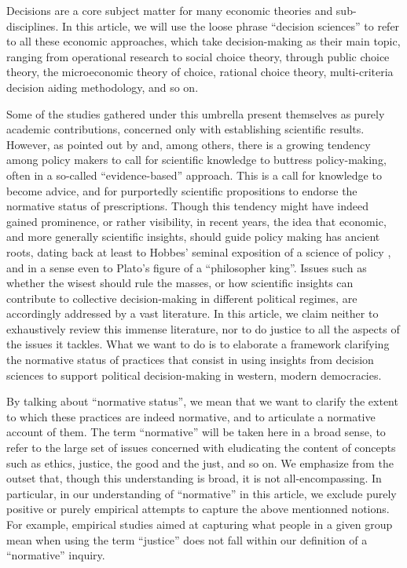 \documentclass[preprint,11pt]{elsarticle}
\begin{document}
\noindent Decisions are a core subject matter for many economic theories and sub-disciplines. In this article, we will use the loose phrase ``decision sciences'' to refer to all these economic approaches, which take decision-making as their main topic, ranging from operational research to social choice theory, through public choice theory, the microeconomic theory of choice, rational choice theory, multi-criteria decision aiding methodology, and so on.

Some of the studies gathered under this umbrella present themselves as purely academic contributions, concerned only with establishing scientific results. However, as pointed out by \cite{tsoukias_policy_2013} and\cite{marchi_evidence-based_2016}, among others, there is a growing tendency among policy makers to call for scientific knowledge to buttress policy-making, often in a so-called ``evidence-based'' approach. This is a call for knowledge to become advice, and for purportedly scientific propositions to endorse the normative status of prescriptions. Though this tendency might have indeed gained prominence, or rather visibility, in recent years, the idea that economic, and more generally scientific insights, should guide policy making has ancient roots, dating back at least to Hobbes’ seminal exposition of a science of policy \citep{skinner_reason_1996}, and in a sense even to Plato’s figure of a ``philosopher king''. Issues such as whether the wisest should rule the masses, or how scientific insights can contribute to collective decision-making in different political regimes, are accordingly addressed by a vast literature. In this article, we claim neither to exhaustively review this immense literature, nor to do justice to all the aspects of the issues it tackles. What we want to do is to elaborate a framework clarifying the normative status of practices that consist in using insights from decision sciences to support political decision-making in western, modern democracies.

By talking about ``normative status'', we mean that we want to clarify the extent to which these practices are indeed normative, and to articulate a normative account of them. The term ``normative'' will be taken here in a broad sense, to refer to the large set of issues concerned with eludicating the content of concepts such as ethics, justice, the good and the just, and so on. We emphasize from the outset that, though this understanding is broad, it is not all-encompassing. In particular, in our understanding of ``normative'' in this article, we exclude purely positive or purely empirical attempts to capture the above mentionned notions. For example, empirical studies aimed at capturing what people in a given group mean when using the term ``justice'' does not fall within our definition of a ``normative'' inquiry.
\end{document}
